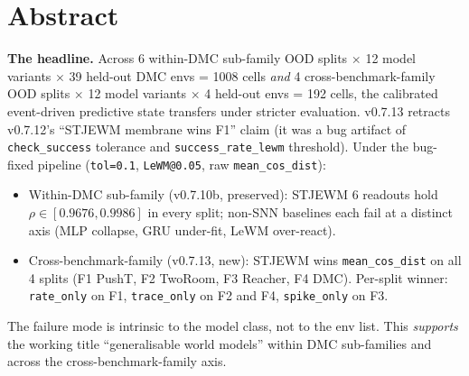 \documentclass{article}
\begin{document}
\section*{Abstract}

\textbf{The headline.} Across 6 within-DMC sub-family OOD splits $\times$ 12 model variants $\times$ 39 held-out DMC envs = 1008 cells \emph{and} 4 cross-benchmark-family OOD splits $\times$ 12 model variants $\times$ 4 held-out envs = 192 cells, the calibrated event-driven predictive state transfers under stricter evaluation. v0.7.13 retracts v0.7.12's ``STJEWM membrane wins F1'' claim (it was a bug artifact of \texttt{check\_success} tolerance and \texttt{success\_rate\_lewm} threshold). Under the bug-fixed pipeline (\texttt{tol=0.1}, \texttt{LeWM@0.05}, raw \texttt{mean\_cos\_dist}):
\begin{itemize}
\item Within-DMC sub-family (v0.7.10b, preserved): STJEWM 6 readouts hold $\rho \in [0.9676, 0.9986]$ in every split; non-SNN baselines each fail at a distinct axis (MLP collapse, GRU under-fit, LeWM over-react).
\item Cross-benchmark-family (v0.7.13, new): STJEWM wins \texttt{mean\_cos\_dist} on all 4 splits (F1 PushT, F2 TwoRoom, F3 Reacher, F4 DMC). Per-split winner: \texttt{rate\_only} on F1, \texttt{trace\_only} on F2 and F4, \texttt{spike\_only} on F3.
\end{itemize}
The failure mode is intrinsic to the model class, not to the env list. This \emph{supports} the working title ``generalisable world models'' within DMC sub-families and across the cross-benchmark-family axis.
\end{document}
